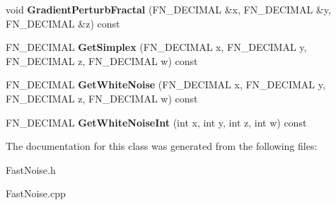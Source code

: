 \begin{DoxyCompactItemize}
\mbox{\label{classFastNoise_a155a219f6356b75e3dfc2610d03e801a}} 
void {\bfseries Gradient\+Perturb\+Fractal} (F\+N\+\_\+\+D\+E\+C\+I\+M\+AL \&x, F\+N\+\_\+\+D\+E\+C\+I\+M\+AL \&y, F\+N\+\_\+\+D\+E\+C\+I\+M\+AL \&z) const
\item 
\mbox{\label{classFastNoise_a699fc06c0d6abe30627c2131606b6bfa}} 
F\+N\+\_\+\+D\+E\+C\+I\+M\+AL {\bfseries Get\+Simplex} (F\+N\+\_\+\+D\+E\+C\+I\+M\+AL x, F\+N\+\_\+\+D\+E\+C\+I\+M\+AL y, F\+N\+\_\+\+D\+E\+C\+I\+M\+AL z, F\+N\+\_\+\+D\+E\+C\+I\+M\+AL w) const
\item 
\mbox{\label{classFastNoise_a39fd417e39c49b29e8ab69381c74974d}} 
F\+N\+\_\+\+D\+E\+C\+I\+M\+AL {\bfseries Get\+White\+Noise} (F\+N\+\_\+\+D\+E\+C\+I\+M\+AL x, F\+N\+\_\+\+D\+E\+C\+I\+M\+AL y, F\+N\+\_\+\+D\+E\+C\+I\+M\+AL z, F\+N\+\_\+\+D\+E\+C\+I\+M\+AL w) const
\item 
\mbox{\label{classFastNoise_aa2e897b4faa4687260314dc1572301ec}} 
F\+N\+\_\+\+D\+E\+C\+I\+M\+AL {\bfseries Get\+White\+Noise\+Int} (int x, int y, int z, int w) const
\end{DoxyCompactItemize}


The documentation for this class was generated from the following files\+:\begin{DoxyCompactItemize}
\item 
Fast\+Noise.\+h\item 
Fast\+Noise.\+cpp\end{DoxyCompactItemize}
